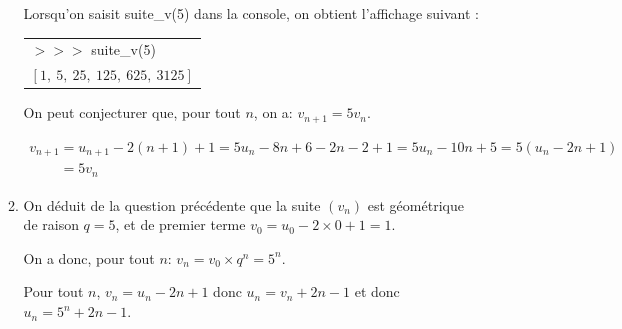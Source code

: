 \documentclass[10pt]{article}
\begin{document}
\begin{enumerate}
\begin{enumerate}
Lorsqu'on saisit {\ttfamily suite\_v(5)} dans la console, on obtient l'affichage suivant :

\begin{center}
\begin{tabular}{>{\ttfamily} l}
$>>>$ suite\_v(5)\\
$[1,~5,~25,~125,~625,~3125]$\\
\end{tabular}
\end{center}



On peut conjecturer que, pour tout $n$, on a: $v_{n+1}=5v_n$.



$\begin{gathered}v_{n+1}=u_{n+1}-2(n+1)+1 = 5u_n -8n +6 -2n-2+1=5u_n-10n+5= 5(u_n-2n+1)\\
\phantom{v_{n+1}}
=5v_n\end{gathered}$

		\item 
On déduit de la question précédente que  la suite $(v_n)$ est géométrique de raison $q=5$, et de premier terme $v_0=u_0-2\times 0+1=1$. 

On a donc, pour tout $n$: $v_n = v_0\times q^n = 5^n$.

Pour tout $n$, $v_n=u_n-2n+1$ donc $u_n=v_n+2n-1$ et donc $u_n= 5^n +2n-1$.
	\end{enumerate}
\end{enumerate}

\bigskip
\end{document}
